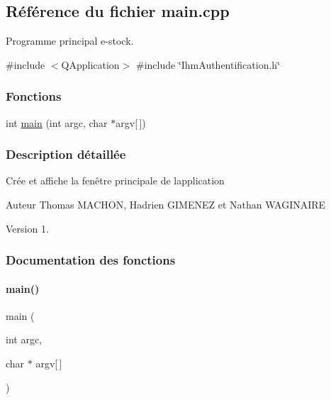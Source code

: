 \hypertarget{ihm-estock_2main_8cpp}{}\subsection{Référence du fichier main.\+cpp}
\label{ihm-estock_2main_8cpp}


Programme principal e-\/stock.  


{\ttfamily \#include $<$Q\+Application$>$}\newline
{\ttfamily \#include \char`\"{}Ihm\+Authentification.\+h\char`\"{}}\newline
\subsubsection*{Fonctions}
\begin{DoxyCompactItemize}
\item 
int \hyperlink{ihm-estock_2main_8cpp_ae0665038b72011f5c680c660fcb59459}{main} (int argc, char $\ast$argv\mbox{[}$\,$\mbox{]})
\end{DoxyCompactItemize}


\subsubsection{Description détaillée}
Crée et affiche la fenêtre principale de l\textquotesingle{}application

\begin{DoxyAuthor}{Auteur}
Thomas M\+A\+C\+H\+ON, Hadrien G\+I\+M\+E\+N\+EZ et Nathan W\+A\+G\+I\+N\+A\+I\+RE
\end{DoxyAuthor}
\begin{DoxyVersion}{Version}
1. 
\end{DoxyVersion}


\subsubsection{Documentation des fonctions}
\mbox{\label{ihm-estock_2main_8cpp_ae0665038b72011f5c680c660fcb59459}} 
\paragraph{\texorpdfstring{main()}{main()}}
{\footnotesize\ttfamily main (\begin{DoxyParamCaption}\item[{int}]{argc,  }\item[{char $\ast$}]{argv\mbox{[}$\,$\mbox{]} }\end{DoxyParamCaption})}



